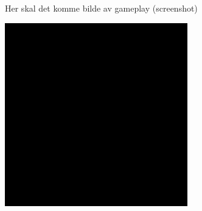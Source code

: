 Her skal det komme bilde av gameplay (screenshot)

\begin{center}
\includegraphics[scale=0.75]{screenshot.png}
\end{center}